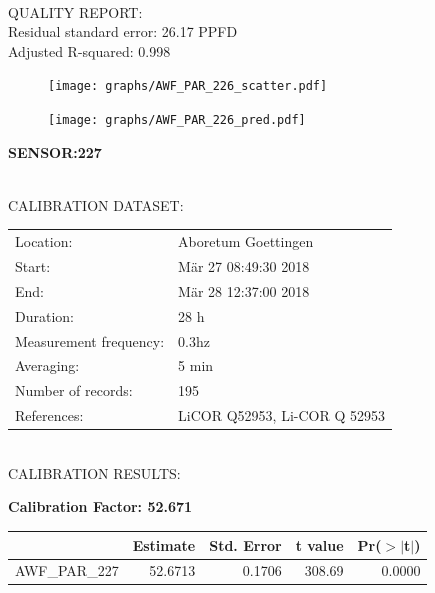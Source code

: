 \documentclass[oneside]{report}
\begin{document}
\hrulefill\\
QUALITY REPORT:\\
Residual standard error: 26.17 PPFD\\
Adjusted R-squared: 0.998



\begin{figure}[H]
  \centering
  \texttt{[image: graphs/AWF\_PAR\_226\_scatter.pdf]}
\end{figure}




\begin{figure}[H]
  \centering
  \texttt{[image: graphs/AWF\_PAR\_226\_pred.pdf]}
\end{figure}

\pagebreak


\begin{center}
\large{\textbf{SENSOR:227}}\\
\end{center}

\hrulefill\\
CALIBRATION DATASET:\\
\begin{table}[h!]
  \centering
  \label{tab:table1}
  \begin{tabular}{ll}
    Location: & Aboretum Goettingen\\ 
    
    
    Start:  & Mär 27 08:49:30 2018 \\
    End:   & Mär 28 12:37:00 2018\\ 
    Duration: & 28 h\\
    Measurement frequency: & 0.3hz\\
    Averaging:  &5 min\\
    Number of records: & 195 \\
    References: & LiCOR Q52953, Li-COR Q 52953 \\
  \end{tabular}
\end{table}

\hrulefill\\
CALIBRATION RESULTS:\\


\begin{center}
\textbf{\large{Calibration Factor: 52.671}}\\
\end{center}
\begin{table}[ht]
\centering
\begin{tabular}{rrrrr}
  \hline
 & Estimate & Std. Error & t value & Pr($>$$|$t$|$) \\ 
  \hline
AWF\_PAR\_227 & 52.6713 & 0.1706 & 308.69 & 0.0000 \\ 
   \hline
\end{tabular}
\end{table}
\end{document}
